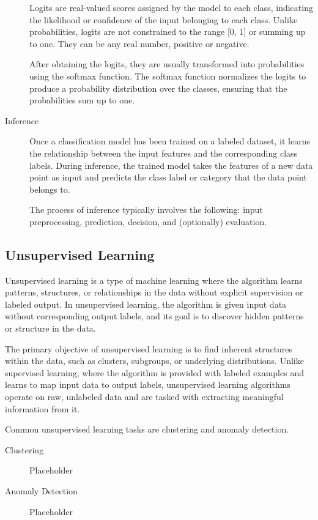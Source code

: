 \documentclass[a4paper]{report}
\begin{document}
\begin{description}
Logits are real-valued scores assigned by the model to each class, indicating the likelihood or confidence of the input belonging to each class. Unlike probabilities, logits are not constrained to the range [0, 1] or summing up to one. They can be any real number, positive or negative.

After obtaining the logits, they are usually transformed into probabilities using the softmax function. The softmax function normalizes the logits to produce a probability distribution over the classes, ensuring that the probabilities sum up to one.

\item[Inference]
Once a classification model has been trained on a labeled dataset, it learns the relationship between the input features and the corresponding class labels. During inference, the trained model takes the features of a new data point as input and predicts the class label or category that the data point belongs to.

The process of inference typically involves the following: input preprocessing, prediction, decision, and (optionally) evaluation.
\end{description}


\subsection*{Unsupervised Learning}
Unsupervised learning is a type of machine learning where the algorithm learns patterns, structures, or relationships in the data without explicit supervision or labeled output. In unsupervised learning, the algorithm is given input data without corresponding output labels, and its goal is to discover hidden patterns or structure in the data.

The primary objective of unsupervised learning is to find inherent structures within the data, such as clusters, subgroups, or underlying distributions. Unlike supervised learning, where the algorithm is provided with labeled examples and learns to map input data to output labels, unsupervised learning algorithms operate on raw, unlabeled data and are tasked with extracting meaningful information from it.

Common unsupervised learning tasks are clustering and anomaly detection.

\begin{description}
\item[Clustering]
Placeholder

\item[Anomaly Detection]
Placeholder
\end{description}
\end{document}
